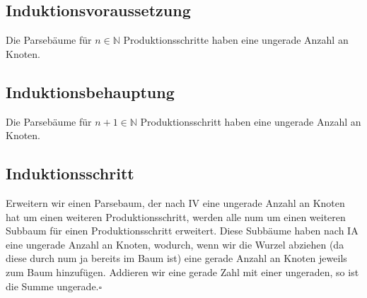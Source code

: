 \documentclass[a4paper,10pt]{scrartcl}
\begin{document}
\subsection*{Induktionsvoraussetzung}
Die Parsebäume für $n \in \mathbb{N}$ Produktionsschritte haben eine ungerade
Anzahl an Knoten.
\subsection*{Induktionsbehauptung}
Die Parsebäume für $n+1 \in \mathbb{N}$ Produktionsschritt haben eine ungerade
Anzahl an Knoten.
\subsection*{Induktionsschritt} Erweitern wir einen Parsebaum, der nach IV eine
ungerade Anzahl an Knoten hat um einen weiteren Produktionsschritt, werden alle
num um einen weiteren Subbaum für einen Produktionsschritt erweitert. Diese
Subbäume haben nach IA eine ungerade Anzahl an Knoten, wodurch, wenn wir die
Wurzel abziehen (da diese durch num ja bereits im Baum ist) eine gerade Anzahl
an Knoten jeweils zum Baum hinzufügen. Addieren wir eine gerade Zahl mit einer
ungeraden, so ist die Summe ungerade.\hfill$\square$
 
\end{document}
